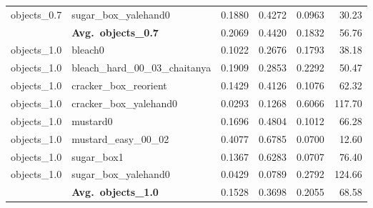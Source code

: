 \begin{longtable}{llrrrr}
  objects_0.7 & sugar\_box\_yalehand0 & 0.1880 & 0.4272 & 0.0963 & 30.23 \\
  \cmidrule{2-6}
  & \textbf{Avg.~objects_0.7} & 0.2069 & 0.4420 & 0.1832 & 56.76 \\
  \midrule
  objects_1.0 & bleach0 & 0.1022 & 0.2676 & 0.1793 & 38.18 \\
  objects_1.0 & bleach\_hard\_00\_03\_chaitanya & 0.1909 & 0.2853 & 0.2292 & 50.47 \\
  objects_1.0 & cracker\_box\_reorient & 0.1429 & 0.4126 & 0.1076 & 62.32 \\
  objects_1.0 & cracker\_box\_yalehand0 & 0.0293 & 0.1268 & 0.6066 & 117.70 \\
  objects_1.0 & mustard0 & 0.1696 & 0.4804 & 0.1012 & 66.28 \\
  objects_1.0 & mustard\_easy\_00\_02 & 0.4077 & 0.6785 & 0.0700 & 12.60 \\
  objects_1.0 & sugar\_box1 & 0.1367 & 0.6283 & 0.0707 & 76.40 \\
  objects_1.0 & sugar\_box\_yalehand0 & 0.0429 & 0.0789 & 0.2792 & 124.66 \\
  \cmidrule{2-6}
  & \textbf{Avg.~objects_1.0} & 0.1528 & 0.3698 & 0.2055 & 68.58 \\
  \midrule
\bottomrule
\end{longtable}
